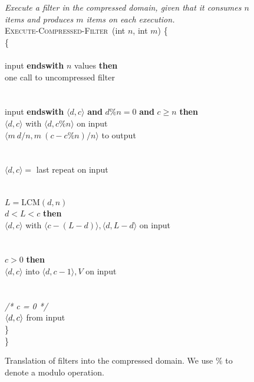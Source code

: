 \begin{figure}[t!]
\centering
\begin{minipage}{0.7\textwidth}
{\it Execute a filter in the compressed domain, given that it consumes
  $n$ items and produces $m$ items on each execution.}\\
\textsc{Execute-Compressed-Filter}~(int $n$, int $m$) \{\\
 \{\\
\tab{} \\
\tab{} input {\bf endswith} $n$ values {\bf then}\\
\tab\tab{} one call to uncompressed filter\\
\tab\tab~\\
\tab{} \\
\tab{} input {\bf endswith} $\langle d,c \rangle$ {\bf and} $d\%n = 0$ {\bf and} $c \geq n$ {\bf then}\\
\tab\tab{} $\langle d,c \rangle$ with $\langle d, c\%n\rangle$ on input\\
\tab\tab{} $\langle m~d/n, m~(c-c\%n)/n \rangle$ to output\\
\tab\tab~\\
\tab{}\\
\tab\tab{} $\langle d,c \rangle = $ last repeat on input\\
\tab\tab\\
\tab\tab{}\\
\tab\tab{} $L = \mbox{LCM}(d, n)$\\
\tab\tab{} $d < L < c$ {\bf then}\\
\tab\tab\tab{} $\langle d,c \rangle$ with $\langle c - (L - d) \rangle, \langle d, L - d\rangle$ on input\\
\tab\tab\\
\tab\tab{}\\
\tab\tab{} $c > 0$ {\bf then}\\
\tab\tab\tab{} $\langle d,c \rangle$ into $\langle d,c-1\rangle,V$ on input\\
\tab\tab\tab\tab\\
\tab\tab{}\\
\tab\tab{} {\it /* c = 0 */}\\
\tab\tab\tab{} $\langle d, c\rangle$ from input\\
\tab\}\\
\}
\end{minipage}
\caption[Translation of filters into the compressed
  domain.]{Translation of filters into the compressed domain.  We use
  $\%$ to denote a modulo operation.
\protect\label{fig:translate-filter}}
\end{figure}

